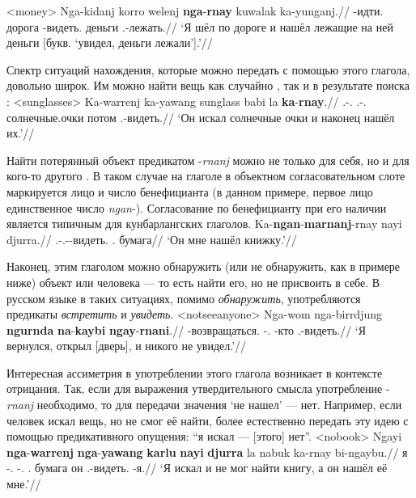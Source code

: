 \ex<money>\begingl
\gla Nga-kidanj korro welenj \textbf{nga}-\textbf{rnay} kuwalak ka-yunganj.//
\glb \nga-идти.\Pst{} \korro{} дорога \nga-видеть.\Pst{} деньги \Tsg.\Real-лежать.\Pst{}//
\glft `Я шёл по дороге и нашёл лежащие на ней деньги [букв. `увидел, деньги лежали'].'//%
\endgl\xe

Спектр ситуаций нахождения, которые можно передать с помощью этого глагола, довольно широк. Им можно найти вещь как случайно , так и в результате поиска :
\ex<sunglasses>\begingl
\gla Ka-warrenj ka-yawang sunglass babi la \textbf{ka}-\textbf{rnay}.//
\glb \Tsg.\Real-\warre.\Pst{} \Tsg.\Real-\yaw.\Pst{} солнечные.очки потом \la{} \Tsg.\Real-видеть.\Pst{}//
\glft `Он искал солнечные очки и наконец нашёл их.'//%
\endgl\xe

Найти потерянный объект предикатом -\textit{rnanj} можно не только для себя, но и для кого-то другого . В таком случае на глаголе в объектном согласовательном слоте маркируется лицо и число бенефицианта (в данном примере, первое лицо единственное число \textit{ngan}-). Согласование по бенефицианту при его наличии является типичным для кунбарлангских глаголов. 
\begingl
\gla Ka-\textbf{ngan}-\textbf{marnanj}-rnay nayi djurra.//
\glb \Tsg.\Real-\Fsg.\Obj-\Ben-видеть.\Pst{} \Nm.\Cli{} бумага//
\glft `Он мне нашёл книжку.'//%
\endgl\xe

Наконец, этим глаголом можно обнаружить (или не обнаружить, как в примере ниже) объект или человека --- то есть найти его, но не присвоить в себе. В русском языке в таких ситуациях, помимо \textit{обнаружить}, употребляются предикаты \textit{встретить} и \textit{увидеть}.
\ex<notseeanyone>\begingl
\gla Nga-wom nga-birrdjung \textbf{ngurnda} \textbf{na}-\textbf{kaybi} \textbf{ngay}-\textbf{rnani}.//
\glb \nga-возвращаться.\Pst{} \nga-\bdj.\Pst{} \Neg{} \Cli-кто \Fsg.\irrpst-видеть.\irrpst{}//
\glft `Я вернулся, открыл [дверь], и никого не увидел.'//%
\endgl\xe


Интересная ассиметрия в употреблении этого глагола возникает в контексте отрицания. Так, если для выражения утвердительного смысла употребление -\textit{rnanj} необходимо, то для передачи значения `не нашел' --- нет. Например, если человек искал вещь, но не смог её найти, более естественно передать эту идею с помощью предикативного опущения: ``я искал --- [этого] нет''.
\ex<nobook>\begingl
\gla Ngayi \textbf{nga}-\textbf{warrenj} \textbf{nga}-\textbf{yawang} \textbf{karlu} \textbf{nayi} \textbf{djurra} la nabuk ka-rnay bi-ngaybu.//
\glb я \nga-\warre.\Pst{} \nga-\yaw.\Pst{} \karlu{} \Nm.\Cli{} бумага \la{} он \Tsg.\Real-видеть.\Pst{} \bi-я.\Gen{}//
\glft `Я искал и не мог найти книгу, а он нашёл её мне.'//%
\endgl\xe

